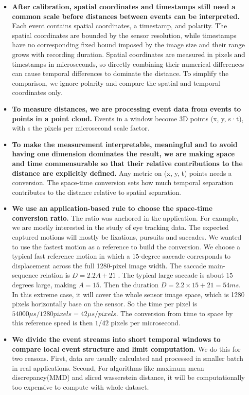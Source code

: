 \begin{itemize}

  \item \textbf{After calibration, spatial coordinates and timestamps still need a common scale before distances between events can be interpreted.} Each event contains spatial coordinates, a timestamp, and polarity. The spatial coordinates are bounded by the sensor resolution, while timestamps have no corresponding fixed bound imposed by the image size and their range grows with recording duration. Spatial coordinates are measured in pixels and timestamps in microseconds, so directly combining their numerical differences can cause temporal differences to dominate the distance. To simplify the comparison, we ignore polarity and compare the spatial and temporal coordinates only.

  \item \textbf{To measure distances, we are processing event data from events to points in a point cloud.} Events in a window become 3D points (x, y, s·t), with s the pixels per microsecond scale factor.
  
  \item \textbf{To make the measurement interpretable, meaningful and to avoid having one dimension dominates the result, we are making space and time commensurable so that their relative contributions to the distance are explicitly defined.}  Any metric on (x, y, t) points needs a conversion. The space-time conversion sets how much temporal separation contributes to the distance relative to spatial separation.
  
  \item \textbf{We use an application-based rule to choose the space-time conversion ratio.} The ratio was anchored in the application. For example, we are mostly interested in the study of eye tracking data. The expected captured motions will mostly be  fixations, pursuits and saccades. We wanted to use the fastest motion as a reference to build the conversion. We choose a typical fast reference motion in which a 15-degree saccade corresponds to displacement across the full 1280-pixel image width. The saccade main-sequence relation is $D = 2.2A + 21$ \cite{bahill1975mainsequence,carpenter1988movements,gibaldi2021saccade}. The typical large saccade is about 15 degrees large, making $A=15$. Then the duration $D=2.2 \times 15 + 21 = 54ms$. In this extreme case, it will cover the whole sensor image space, which is 1280 pixels horizontally base on the sensor. So the time per pixel is $54000 \mu s / 1280 pixels = 42 \mu s/pixels$. The conversion from time to space by this reference speed is then $1/42$ pixels per microsecond. 
  
  \item \textbf{We divide the event streams into short temporal windows to compare local event structure and limit computation.} We do this for two reasons. First, data are usually calculated and processed in smaller batch in real applications. Second, For algorithms like maximum mean discrepancy(MMD) and sliced wasserstein distance, it will be computationally too expensive to compute with whole dataset.
  
\end{itemize}

